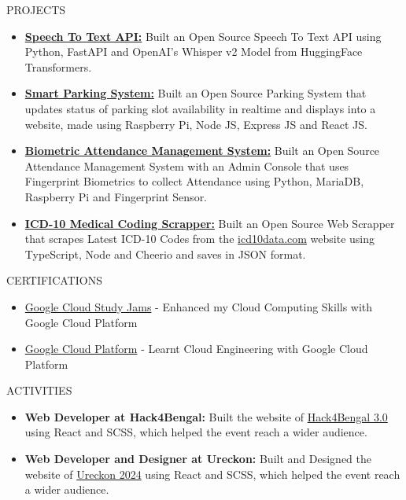 \documentclass{resume}
\begin{document}
\begin{rSection}{PROJECTS}
  \begin{itemize}
    \item \textbf{\href{https://github.com/Arkapravo-Ghosh/speech-to-text}{Speech To Text API:}} {Built an Open Source Speech To Text API using Python, FastAPI and OpenAI's Whisper v2 Model from HuggingFace Transformers.}
    \item \textbf{\href{https://github.com/Arkapravo-Ghosh/Smart-Parking-System}{Smart Parking System:}} {Built an Open Source Parking System that updates status of parking slot availability in realtime and displays into a website, made using Raspberry Pi, Node JS, Express JS and React JS.}
    \item \textbf{\href{https://github.com/Arkapravo-Ghosh/attendance-monitoring-system}{Biometric Attendance Management System:}} {Built an Open Source Attendance Management System with an Admin Console that uses Fingerprint Biometrics to collect Attendance using Python, MariaDB, Raspberry Pi and Fingerprint Sensor.}
    \item \textbf{\href{https://github.com/Arkapravo-Ghosh/icd10-scrapper}{ICD-10 Medical Coding Scrapper:}} {Built an Open Source Web Scrapper that scrapes Latest ICD-10 Codes from the {\href{https://www.icd10data.com}{icd10data.com}} website using TypeScript, Node and Cheerio and saves in JSON format.}
  \end{itemize}
\end{rSection}
\vspace{-0.4em}
\begin{rSection}{CERTIFICATIONS}
  \begin{itemize}
    \item \href{https://www.cloudskillsboost.google/public_profiles/dcbf7583-1c68-4d5c-a408-9ad45d93130d}{Google Cloud Study Jams} - Enhanced my Cloud Computing Skills with Google Cloud Platform
    \item \href{https://www.cloudskillsboost.google/public_profiles/7594501c-7933-4fba-be9b-2a92ca3ee410}{Google Cloud Platform} - Learnt Cloud Engineering with Google Cloud Platform
  \end{itemize}
\end{rSection}
\vspace{-0.4em}
\begin{rSection}{ACTIVITIES}
  \begin{itemize}
    \item \textbf{Web Developer at Hack4Bengal:} Built the website of {\href{https://hack4bengal.tech}{Hack4Bengal 3.0}} using React and SCSS, which helped the event reach a wider audience.
    \item \textbf{Web Developer and Designer at Ureckon:} Built and Designed the website of {\href{https://ureckon.uem.edu.in}{Ureckon 2024}} using React and SCSS, which helped the event reach a wider audience.
  \end{itemize}
\end{rSection}
\end{document}
